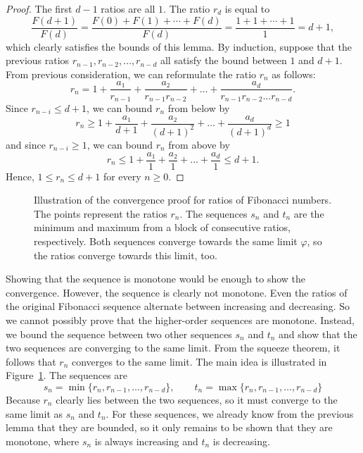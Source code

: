\begin{proof}
  The first $d - 1$ ratios are all $1$.
  The ratio $r_d$ is equal to
  \[
    \frac{F(d+1)}{F(d)} = \frac{F(0) + F(1) + ⋯ + F(d)}{F(d)} = \frac{1 + 1 + ⋯ + 1}{1} = d + 1,
  \]
  which clearly satisfies the bounds of this lemma.
  By induction, suppose that the previous ratios $r_{n-1}, r_{n-2}, …, r_{n-d}$
  all satisfy the bound between $1$ and $d+1$.
  From previous consideration, we can reformulate the ratio $r_n$ as follows:
  \[
    r_n = 1 + \frac{a₁}{r_{n-1}} + \frac{a₂}{r_{n-1} r_{n-2}} + \dots + \frac{a_d}{r_{n-1} r_{n-2} \dots r_{n-d}}.
  \]
  Since $r_{n-i} ≤ d+1$, we can bound $r_n$ from below by
  \[
    r_n ≥ 1 + \frac{a₁}{d+1} + \frac{a₂}{(d+1)^2} + \dots + \frac{a_d}{(d+1)^d} ≥ 1
  \]
  and since $r_{n-i} ≥ 1$, we can bound $r_n$ from above by
  \[
    r_n ≤ 1 + \frac{a₁}{1} + \frac{a₂}{1} + \dots + \frac{a_d}{1} ≤ d+1.
  \]
  Hence, $1 ≤ r_n ≤ d+1$ for every $n ≥ 0$.
\end{proof}

\begin{figure}[tbp]
  \centering
  
  \caption{
    Illustration of the convergence proof for ratios of Fibonacci numbers.
    The points represent the ratios $r_n$.
    The sequences $s_n$ and $t_n$ are the minimum and maximum from a block of
    consecutive ratios, respectively.
    Both sequences converge towards the same limit $φ$, so the ratios converge
    towards this limit, too.
  }
  \label{fig:fibonacci-convergence}
\end{figure}

Showing that the sequence is monotone would be enough to show the convergence.
However, the sequence is clearly not monotone.
Even the ratios of the original Fibonacci sequence alternate between increasing
and decreasing.
So we cannot possibly prove that the higher-order sequences are monotone.
Instead, we bound the sequence between two other sequences $s_n$ and $t_n$
and show that the two sequences are converging to the same limit.
From the squeeze theorem, it follows that $r_n$ converges to the same limit.
The main idea is illustrated in Figure~\ref{fig:fibonacci-convergence}.
The sequences are
\[
  s_n = \min\{r_n, r_{n-1}, …, r_{n-d} \}, \qquad t_n = \max\{r_n, r_{n-1}, …, r_{n-d}\}
\]
Because $r_n$ clearly lies between the two sequences, so it must converge to the same limit as $s_n$ and $t_n$.
For these sequences, we already know from the previous lemma that they are bounded,
so it only remains to be shown that they are monotone,
where $s_n$ is always increasing and $t_n$ is decreasing.

